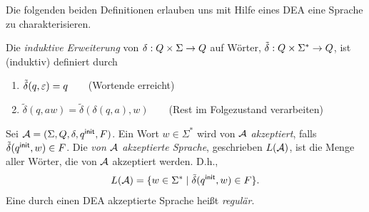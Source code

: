 \begin{center}
\end{center}

Die folgenden beiden Definitionen erlauben uns mit Hilfe eines \acs*{DEA} eine Sprache zu charakterisieren.
\begin{Def}[name={[Induktive erweiterung von $\delta$ auf Wörter]}]\label{def:2.deltaschlange}
        Die \emph{induktive Erweiterung} von $\delta:Q\x\Sigma\->Q$ auf Wörter, $\tilde{\delta}: Q\x\Sigma^*\->Q$, ist (induktiv) definiert durch
  \begin{enumerate}
  \item $\tilde\delta(q,\varepsilon) =q$\ \ \ \  (Wortende erreicht)
  \item $\tilde\delta(q,aw)=\tilde\delta(\delta(q,a),w)$\ \ \ \ (Rest im Folgezustand verarbeiten)
  \qedhere
  \end{enumerate}
\end{Def}
\begin{Def}[name={[Die durch einen \acs*{DEA} akzeptierte Sprache]}]\label{def:2.sprache}
        Sei $\mathcal{A}=(\Sigma, Q,\delta,q^\mathsf{init},F)$. 
        Ein Wort $w\in\Sigma^*$ wird von $\mathcal{A}$ \emph{akzeptiert}, falls $\tilde\delta(q^\mathsf{init},w)\in F$.
        Die \emph{von $\mathcal{A}$ akzeptierte Sprache}, geschrieben $L(\mathcal{A})$, ist die Menge aller Wörter, die von $\mathcal{A}$ akzeptiert werden. D.h., 
        \[ L(\mathcal{A}) = \{ w\in\Sigma^* \mid \tilde\delta(q^\mathsf{init},w)\in F \}. \]
        Eine durch einen \acs*{DEA} akzeptierte Sprache heißt \emph{regulär}.
\end{Def}


